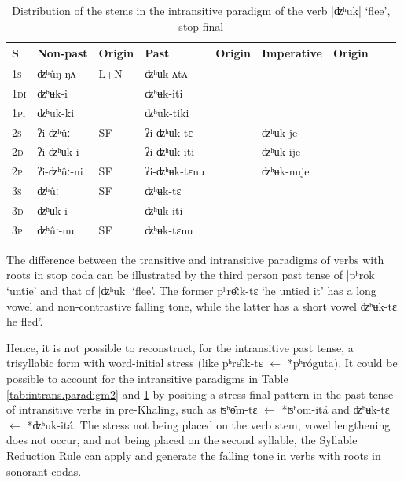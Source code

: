 \documentclass[oldfontcommands,oneside,a4paper,11pt]{article}
\newcommand{\ipa}[1]{{\phon \mbox{#1}}} %
\begin{document}
\begin{table}[h]
\caption{Distribution of the stems in the intransitive paradigm of the verb |ʣʰuk| `flee', stop final} \label{tab:intrans.paradigm3} \centering
\begin{tabular}{lllllllll}
\toprule
S & Non-past & Origin & Past & Origin & Imperative & Origin \\
\midrule
\textsc{1s} & \ipa{ʣʰûŋ-ŋʌ} &L+N & \ipa{ʣʰʉk-ʌtʌ} &\\
\textsc{1di} & \ipa{ʣʰʉk-i} && \ipa{ʣʰʉk-iti}& \\
\textsc{1pi} & \ipa{ʣʰuk-ki} && \ipa{ʣʰuk-tiki} &&\\
\textsc{2s} & \ipa{ʔi-ʣʰûː} &SF &\ipa{ʔi-ʣʰʉk-tɛ}  & &\ipa{ʣʰʉk-je}& \\
\textsc{2d} & \ipa{ʔi-ʣʰʉk-i}  & &\ipa{ʔi-ʣʰʉk-iti} &&\ipa{ʣʰʉk-ije} &\\
\textsc{2p} & \ipa{ʔi-ʣʰûː-ni} &SF& \ipa{ʔi-ʣʰʉk-tɛnu} & &\ipa{ʣʰʉk-nuje}& \\
\textsc{3s} & \ipa{ʣʰûː} & SF&\ipa{ʣʰʉk-tɛ} & \\
\textsc{3d} & \ipa{ʣʰʉk-i} & &\ipa{ʣʰʉk-iti} &\\
\textsc{3p} & \ipa{ʣʰûː-nu} &SF& \ipa{ʣʰʉk-tɛnu} & \\
\bottomrule
\end{tabular}
\end{table}

The difference between the transitive and intransitive paradigms of verbs with roots in stop coda can be illustrated by the third person past tense of |pʰrok| `untie' and that of |ʣʰuk| `flee'. The former \ipa{pʰrɵ̂ːk-tɛ} `he untied it' has a long vowel and non-contrastive falling tone, while the latter has a short vowel \ipa{ʣʰʉk-tɛ}  he fled'.

Hence, it is not possible to reconstruct, for the intransitive past tense, a trisyllabic form with word-initial stress (like  \ipa{pʰrɵ̂ːk-tɛ} $\leftarrow$ \ipa{*pʰróguta}). It could be possible to account for the intransitive paradigms in Table \ref{tab:intrans.paradigm2} and \ref{tab:intrans.paradigm3} by positing a stress-final pattern in the past tense of intransitive verbs in pre-Khaling, such as \ipa{ʦʰɵ̂m-tɛ} $\leftarrow$  \ipa{*ʦʰom-itá} and \ipa{ʣʰʉk-tɛ} $\leftarrow$ \ipa{*ʣʰuk-itá}.  The stress not being placed on the verb stem, vowel lengthening does not occur, and not being placed on the second syllable, the Syllable Reduction Rule can apply and generate the falling tone in verbs with roots in sonorant codas.
\end{document}
